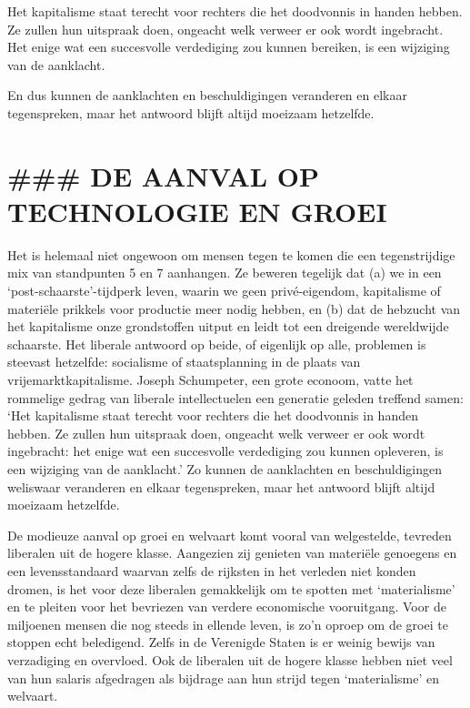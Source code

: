 \documentclass[
  a5paper,
  smalldemyvopaper,10pt,twoside,onecolumn,openright,extrafontsizes,hidelinks]{memoir}
\renewenvironment{quote}%
               {\list{}{\rightmargin=.6cm\leftmargin=.6cm}%
                \itshape \item[]}%
               {\endlist}
\begin{document}
\begin{quote}
Het kapitalisme staat terecht voor rechters die het doodvonnis in handen
hebben. Ze zullen hun uitspraak doen, ongeacht welk verweer er ook wordt
ingebracht. Het enige wat een succesvolle verdediging zou kunnen
bereiken, is een wijziging van de aanklacht.
\end{quote}

En dus kunnen de aanklachten en beschuldigingen veranderen en elkaar
tegenspreken, maar het antwoord blijft altijd moeizaam hetzelfde.

\section{\#\#\# DE AANVAL OP TECHNOLOGIE EN
GROEI}\label{de-aanval-op-technologie-en-groei}

Het is helemaal niet ongewoon om mensen tegen te komen die een
tegenstrijdige mix van standpunten 5 en 7 aanhangen. Ze beweren tegelijk
dat (a) we in een `post-schaarste'-tijdperk leven, waarin we geen
privé-eigendom, kapitalisme of materiële prikkels voor productie meer
nodig hebben, en (b) dat de hebzucht van het kapitalisme onze
grondstoffen uitput en leidt tot een dreigende wereldwijde schaarste.
Het liberale antwoord op beide, of eigenlijk op alle, problemen is
steevast hetzelfde: socialisme of staatsplanning in de plaats van
vrijemarktkapitalisme. Joseph Schumpeter, een grote econoom, vatte het
rommelige gedrag van liberale intellectuelen een generatie geleden
treffend samen: `Het kapitalisme staat terecht voor rechters die het
doodvonnis in handen hebben. Ze zullen hun uitspraak doen, ongeacht welk
verweer er ook wordt ingebracht: het enige wat een succesvolle
verdediging zou kunnen opleveren, is een wijziging van de aanklacht.' Zo
kunnen de aanklachten en beschuldigingen weliswaar veranderen en elkaar
tegenspreken, maar het antwoord blijft altijd moeizaam hetzelfde.

De modieuze aanval op groei en welvaart komt vooral van welgestelde,
tevreden liberalen uit de hogere klasse. Aangezien zij genieten van
materiële genoegens en een levensstandaard waarvan zelfs de rijksten in
het verleden niet konden dromen, is het voor deze liberalen gemakkelijk
om te spotten met `materialisme' en te pleiten voor het bevriezen van
verdere economische vooruitgang. Voor de miljoenen mensen die nog steeds
in ellende leven, is zo'n oproep om de groei te stoppen echt beledigend.
Zelfs in de Verenigde Staten is er weinig bewijs van verzadiging en
overvloed. Ook de liberalen uit de hogere klasse hebben niet veel van
hun salaris afgedragen als bijdrage aan hun strijd tegen `materialisme'
en welvaart.
\end{document}
